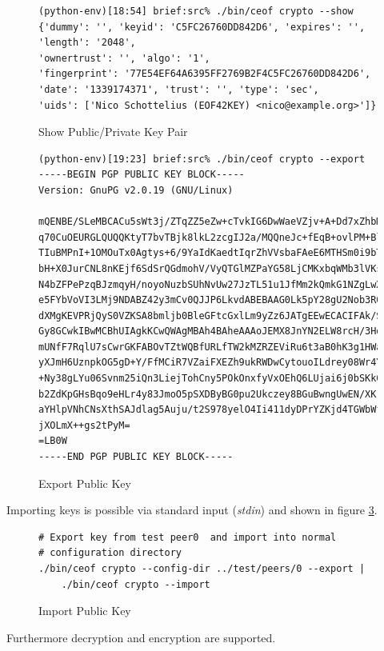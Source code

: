 \begin{figure}[htbp]
\caption{Show Public/Private Key Pair}
\label{showkey}
\begin{verbatim}
(python-env)[18:54] brief:src% ./bin/ceof crypto --show
{'dummy': '', 'keyid': 'C5FC26760DD842D6', 'expires': '', 'length': '2048',
'ownertrust': '', 'algo': '1',
'fingerprint': '77E54EF64A6395FF2769B2F4C5FC26760DD842D6',
'date': '1339174371', 'trust': '', 'type': 'sec',
'uids': ['Nico Schottelius (EOF42KEY) <nico@example.org>']}
\end{verbatim}
\end{figure}
\begin{figure}[htbp]
\caption{Export Public Key}
\label{exportkey}
\begin{verbatim}
(python-env)[19:23] brief:src% ./bin/ceof crypto --export
-----BEGIN PGP PUBLIC KEY BLOCK-----
Version: GnuPG v2.0.19 (GNU/Linux)

mQENBE/SLeMBCACu5sWt3j/ZTqZZ5eZw+cTvkIG6DwWaeVZjv+A+Dd7xZhbMBeyZ
q70CuOEURGLQUQQKtyT7bvTBjk8lkL2zcgIJ2a/MQQneJc+fEqB+ovlPM+Bl4qLf
TIuBMPnI+1OMOuTx0Agtys+6/9YaIdKaedtIqrZhVVsbaFAeE6MTHSm0i9bTtvyk
bH+X0JurCNL8nKEjf6SdSrQGdmohV/VyQTGlMZPaYG58LjCMKxbqWMb3lVKsmyRr
N4bZFPePzqBJzmqyH/noyoNuzbSUhNvUw27JzTL51u1JfMm2kQmkG1NZgLwXg6/W
e5FYbVoVI3LMj9NDABZ42y3mCv0QJJP6LkvdABEBAAG0Lk5pY28gU2Nob3R0ZWxp
dXMgKEVPRjQyS0VZKSA8bmljb0BleGFtcGxlLm9yZz6JATgEEwECACIFAk/SLeMC
Gy8GCwkIBwMCBhUIAgkKCwQWAgMBAh4BAheAAAoJEMX8JnYN2ELW8rcH/3Hdanzp
mUNfF7RqlU7sCwrGKFABOvTZtWQBfURLfTW2kMZRZEViRu6t3aB0hK3g1HWaSBzb
yXJmH6UznpkOG5gD+Y/FfMCiR7VZaiFXEZh9ukRWDwCytouoILdrey08Wr4YQEDf
+Ny38gLYu06Svnm25iQn3LiejTohCny5POkOnxfyVxOEhQ6LUjai6j0bSKk05o62
b2ZdKpGHsBqo9eHLr4y83JmoO5pSXDByBG0pu2Ukczey8BGuBwngUwEN/XKrl1xZ
aYHlpVNhCNsXthSAJdlag5Auju/t2S978yelO4Ii411dyDPrYZKjd4TGWbWfeVpS
jXOLmX++gs2tPyM=
=LB0W
-----END PGP PUBLIC KEY BLOCK-----
\end{verbatim}
\end{figure}
Importing keys is possible via standard input (\textit{stdin})
and shown in figure \ref{importkey}.
\begin{figure}[htbp]
\caption{Import Public Key}
\label{importkey}
\begin{verbatim}
# Export key from test peer0  and import into normal
# configuration directory
./bin/ceof crypto --config-dir ../test/peers/0 --export | 
    ./bin/ceof crypto --import
\end{verbatim}
\end{figure}
Furthermore decryption and encryption are supported.
